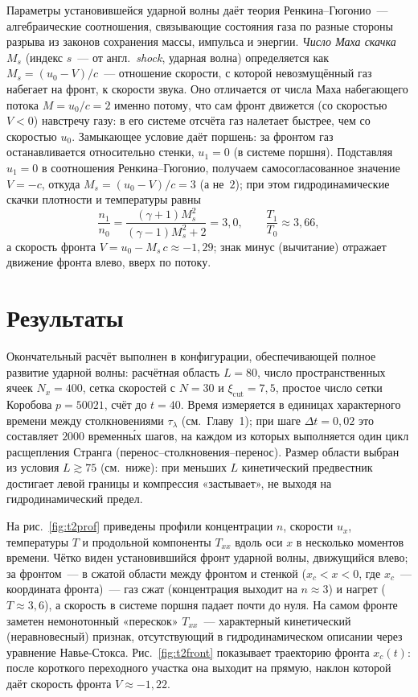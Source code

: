 Параметры установившейся ударной волны даёт теория Ренкина--Гюгонио~--- алгебраические соотношения, связывающие
состояния газа по разные стороны разрыва из законов сохранения массы, импульса и энергии.
\emph{Число Маха скачка} $M_s$ (индекс $s$~--- от англ.\ \emph{shock}, ударная волна) определяется как
$M_s=(u_0-V)/c$~--- отношение скорости, с которой невозмущённый газ набегает на фронт, к скорости звука.
Оно отличается от числа Маха набегающего потока $M=u_0/c=2$ именно потому, что сам фронт движется (со скоростью $V<0$)
навстречу газу: в его системе отсчёта газ налетает быстрее, чем со скоростью $u_0$.
Замыкающее условие даёт поршень: за фронтом газ останавливается относительно стенки, $u_1=0$ (в системе поршня).
Подставляя $u_1=0$ в соотношения Ренкина--Гюгонио, получаем самосогласованное значение $V=-c$, откуда $M_s=(u_0-V)/c=3$
(а не~$2$); при этом гидродинамические скачки плотности и температуры равны
\begin{equation}
    \frac{n_1}{n_0}=\frac{(\gamma+1)M_s^2}{(\gamma-1)M_s^2+2}=3{,}0,\qquad \frac{T_1}{T_0}\approx 3{,}66,
\end{equation}
а скорость фронта $V=u_0-M_s\,c\approx-1{,}29$; знак минус (вычитание) отражает движение фронта влево, вверх по потоку.

\section{Результаты}

Окончательный расчёт выполнен в конфигурации, обеспечивающей полное развитие ударной волны: расчётная область $L=80$,
число пространственных ячеек $N_x=400$, сетка скоростей с $N=30$ и $\xi_{\mathrm{cut}}=7{,}5$, простое число сетки
Коробова $p=50021$, счёт до $t=40$.
Время измеряется в единицах характерного времени между столкновениями $\tau_\lambda$ (см.\ Главу~1); при шаге $\Delta
t=0{,}02$ это составляет $2000$ временны́х шагов, на каждом из которых выполняется один цикл расщепления Странга
(перенос--столкновения--перенос).
Размер области выбран из условия $L\gtrsim 75$ (см.\ ниже): при меньших $L$ кинетический предвестник достигает левой
границы и компрессия «застывает», не выходя на гидродинамический предел.

На рис.~\ref{fig:t2prof} приведены профили концентрации $n$, скорости $u_x$, температуры $T$ и продольной компоненты
$T_{xx}$ вдоль оси $x$ в несколько моментов времени.
Чётко виден установившийся фронт ударной волны, движущийся влево; за фронтом~--- в сжатой области между фронтом и
стенкой ($x_c<x<0$, где $x_c$~--- координата фронта)~--- газ сжат (концентрация выходит на $n\approx3$) и нагрет
($T\approx3{,}6$), а скорость в системе поршня падает почти до нуля.
На самом фронте заметен немонотонный «перескок» $T_{xx}$~--- характерный кинетический (неравновесный) признак,
отсутствующий в гидродинамическом описании через уравнение Навье-Стокса.
Рис.~\ref{fig:t2front} показывает траекторию фронта $x_c(t)$: после короткого переходного участка она выходит на прямую,
наклон которой даёт скорость фронта $V\approx-1{,}22$.

